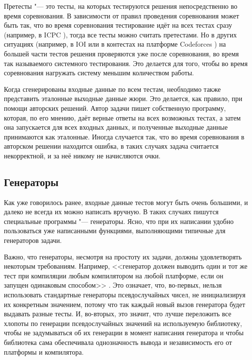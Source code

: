 Претесты "--- это тесты, на которых тестируются решения непосредственно во время соревнования. В зависимости от правил проведения соревнования может быть так, что во время соревнования тестирование идёт на всех тестах сразу (например, в ICPC \cite{wiki}), тогда все тесты можно считать претестами. Но в других ситуациях (например, в IOI \cite{wiki} или в контестах на платформе Codeforces \cite{codeforces}) на большей части тестов решения проверяются уже после соревнования, во время так называемого системного тестирования. Это делается для того, чтобы во время соревнования нагружать систему меньшим количеством работы.

Когда сгенерированы входные данные по всем тестам, необходимо также представить эталонные выходные данные жюри. Это делается, как правило, при помощи авторских решений. Автор задачи пишет собственную программу, которая, по его мнению, даёт верные ответы на всех возможных тестах, а затем она запускается для всех входных данных, и полученные выходные данные принимаются как эталонные. Иногда случается так, что во время соревнования в авторском решении находится ошибка, в таких случаях задача считается некорректной, и за неё никому не начисляются очки.

\subsection*{Генераторы}

Как уже говорилось ранее, входные данные тестов могут быть очень большими, и далеко не всегда их можно написать вручную. В таких случаях пишутся специальные программы "--- генераторы. Ясно, что при их написании удобно пользоваться уже написанными функциями, выполняющими типичные для генераторов задачи.

Важно, что генераторы, несмотря на простоту их задачи, должны удовлетворять некоторым требованиям. Например, <<генератор должен выводить один и тот же тест при компиляции любым компилятором на любой платформе, если он запущен одинаковым способом>> \cite{testlib}. Это означает, что, во-первых, нельзя использовать стандартные генераторы псевдослучайных чисел, не инициализируя их конкретным значением, потому что так каждый новый вызов генератора будет выдавать разные тесты. И, во-вторых, это значит, что лучше переложить все хлопоты по генерации псевдослучайных значений на используемую библиотеку, чтобы не задумываться об их генерации в момент написания генератора и чтобы библиотека сама обеспечивала однозначность вывода и независимость его от платформы и компилятора.

